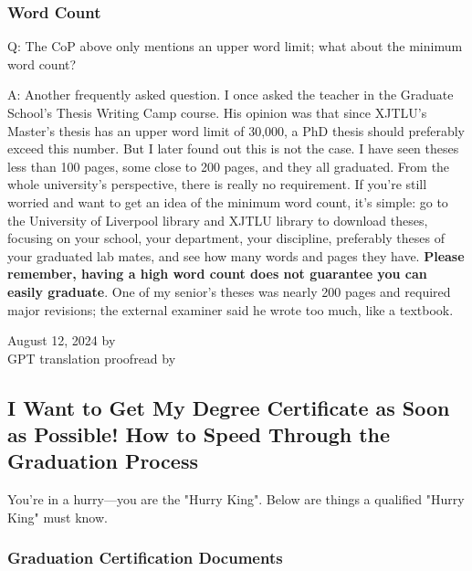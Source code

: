 \subsubsection{Word Count}

Q: The CoP above only mentions an upper word limit; what about the minimum word count?

A: Another frequently asked question. I once asked the teacher in the Graduate School's Thesis Writing Camp course. His opinion was that since XJTLU's Master's thesis has an upper word limit of 30,000, a PhD thesis should preferably exceed this number. But I later found out this is not the case. I have seen theses less than 100 pages, some close to 200 pages, and they all graduated. From the whole university's perspective, there is really no requirement. If you're still worried and want to get an idea of the minimum word count, it's simple: go to the University of Liverpool library and XJTLU library to download theses, focusing on your school, your department, your discipline, preferably theses of your graduated lab mates, and see how many words and pages they have. \textbf{Please remember, having a high word count does not guarantee you can easily graduate}. One of my senior's theses was nearly 200 pages and required major revisions; the external examiner said he wrote too much, like a textbook.

\begin{flushright}
    August 12, 2024 by \Wu \\
    GPT translation proofread by \Shiyao
\end{flushright}



\subsection{I Want to Get My Degree Certificate as Soon as Possible! How to Speed Through the Graduation Process}

You're in a hurry—you are the "Hurry King". Below are things a qualified "Hurry King" must know.

\subsubsection{Graduation Certification Documents}

